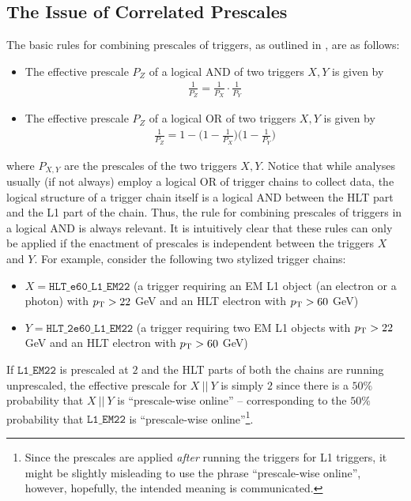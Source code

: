 \subsection{The Issue of Correlated Prescales}
\label{subsec:issue-of-correlated-prescales}
The basic rules for combining prescales of triggers, as outlined in \cite{Buttinger:2014726}, are as follows:
\begin{itemize}
    \item The effective prescale $P_Z$ of a logical AND of two triggers $X,Y$ is given by
    \begin{align}
    \label{eq:buttinger-and}
    \frac{1}{P_Z}=\frac{1}{P_X}\cdot\frac{1}{P_Y}
    \end{align}
    \item The effective prescale $P_Z$ of a logical OR of two triggers $X, Y$ is given by 
    \begin{align}
    \label{eq:buttinger-or}
    \frac{1}{P_Z}=1-\bigg(1-\frac{1}{P_X}\bigg)\bigg(1-\frac{1}{P_Y}\bigg)
    \end{align} 
\end{itemize}
where $P_{X,Y}$ are the prescales of the two triggers $X,Y$. %
Notice that while analyses usually (if not always) employ a logical OR of trigger chains to collect data, the logical structure of a trigger chain itself is a logical AND between the HLT part and the L1 part of the chain. Thus, the rule for combining prescales of triggers in a logical AND is always relevant. %
It is intuitively clear that these rules can only be applied if the enactment of prescales is independent between the triggers $X$ and $Y$. %
For example, consider the following two stylized trigger chains:  
\begin{itemize}
    \item $X=\texttt{HLT\_e60\_L1\_EM22}$ (a trigger requiring an EM L1 object (an electron or a photon) with $p_{\textrm T}>22$ GeV and an HLT electron with $p_{\textrm T}>60$ GeV)
    \item $Y=\texttt{HLT\_2e60\_L1\_EM22}$ (a trigger requiring two EM L1 objects with $p_{\textrm T}>22$ GeV and an HLT electron with $p_{\textrm T}>60$ GeV)
\end{itemize}
If $\texttt{L1\_EM22}$ is prescaled at $2$ and the HLT parts of both the chains are running unprescaled, the effective prescale for $X\ \vert \vert\ Y$ is simply $2$ since there is a $50\%$ probability that  $X\ \vert \vert\ Y$ is ``prescale-wise online'' -- corresponding to the $50\%$ probability that $\texttt{L1\_EM22}$ is ``prescale-wise online''\footnote{Since the prescales are applied \emph{after} running the triggers for L1 triggers, it might be slightly misleading to use the phrase ``prescale-wise online'', however, hopefully, the intended meaning is communicated.}. %
